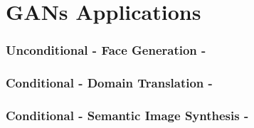 \documentclass{beamer}
\begin{document}
\section{GANs Applications}



{
	\begin{frame}
		\frametitle{Unconditional - Face Generation - \cite{karrasProgressiveGrowingGANs2017}}
	\end{frame}
}

{
	\begin{frame}
		\frametitle{Conditional - Domain Translation - \cite{isolaImagetoImageTranslationConditional2016a}}
	\end{frame}
}


	\begin{frame}
		\frametitle{Conditional - Semantic Image Synthesis - \cite{parkSemanticImageSynthesis2019}}
	\end{frame}
\end{document}
